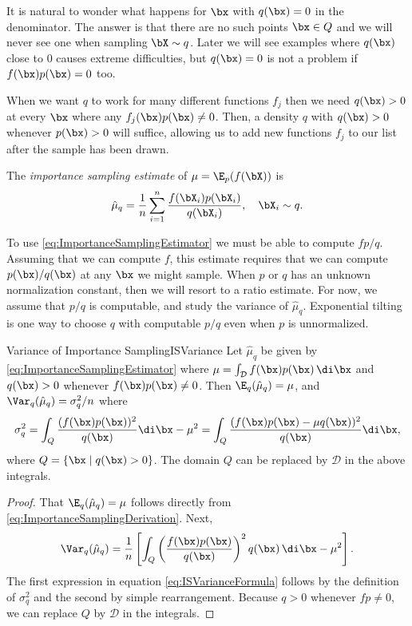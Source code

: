 It is natural to wonder what happens for \(\bx\) with \(q(\bx) = 0\) in the denominator. The answer is that there are no such points \(\bx \in Q\) and we will never see one when sampling \(\bX \sim q\). Later we will see examples where \(q(\bx)\) close to \(0\) causes extreme difficulties, but \(q(\bx) = 0\) is not a problem if \(f(\bx)p(\bx) = 0\) too.

When we want \(q\) to work for many different functions \(f_j\) then we need \(q(\bx) > 0\) at every \(\bx\) where any \(f_j(\bx)p(\bx) \neq 0\). Then, a density \(q\) with \(q(\bx) > 0\) whenever \(p(\bx) > 0\) will suffice, allowing us to add new functions \(f_j\) to our list after the sample has been drawn.

The \textit{importance sampling estimate} of \(\mu = \E_p(f(\bX))\) is
\begin{equation}
	\hat{\mu}_q = \frac{1}{n} \sum_{i=1}^n \frac{f(\bX_i)p(\bX_i)}{q(\bX_i)}, \quad \bX_i \sim q.
	\label{eq:ImportanceSamplingEstimator}
\end{equation}

To use \eqref{eq:ImportanceSamplingEstimator} we must be able to compute \(fp/q\). Assuming that we can compute \(f\), this estimate requires that we can compute \(p(\bx)/q(\bx)\) at any \(\bx\) we might sample. When \(p\) or \(q\) has an unknown normalization constant, then we will resort to a ratio estimate. For now, we assume that \(p/q\) is computable, and study the variance of \(\hat{\mu}_q\). Exponential tilting is one way to choose \(q\) with computable \(p/q\) even when \(p\) is unnormalized.

\begin{thm}{Variance of Importance Sampling}{ISVariance}
	Let \(\hat{\mu}_q\) be given by \eqref{eq:ImportanceSamplingEstimator} where \(\mu = \int_{\mathcal{D}} f(\bx)p(\bx) \, \di \bx\) and \(q(\bx) > 0\) whenever \(f(\bx)p(\bx) \neq 0\). Then \(\E_q(\hat{\mu}_q) = \mu\), and \(\Var_q(\hat{\mu}_q) = \sigma_q^2/n\) where
	\begin{equation}
		\sigma_q^2 = \int_Q \frac{(f(\bx)p(\bx))^2}{q(\bx)} \di \bx - \mu^2 = \int_Q \frac{(f(\bx)p(\bx) - \mu q(\bx))^2}{q(\bx)} \di \bx,
		\label{eq:ISVarianceFormula}
	\end{equation}
	where \(Q = \{ \bx \mid q(\bx) > 0 \}\). The domain \(Q\) can be replaced by \(\mathcal{D}\) in the above integrals.
\end{thm}

\begin{proof}
	That \(\E_q(\hat{\mu}_q) = \mu\) follows directly from \eqref{eq:ImportanceSamplingDerivation}. Next,
	\[
		\Var_q(\hat{\mu}_q) = \frac{1}{n} \left[ \int_Q \left( \frac{f(\bx)p(\bx)}{q(\bx)} \right)^2 q(\bx) \, \di \bx - \mu^2 \right].
	\]
	The first expression in equation \eqref{eq:ISVarianceFormula} follows by the definition of \(\sigma_q^2\) and the second by simple rearrangement. Because \(q > 0\) whenever \(fp \neq 0\), we can replace \(Q\) by \(\mathcal{D}\) in the integrals.
\end{proof}


